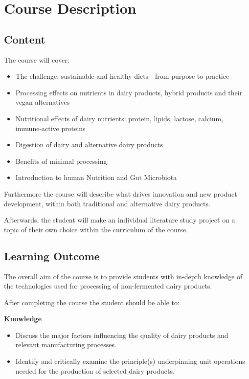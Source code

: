 \chapter*{Course Description}
\setlength{\headheight}{12.71342pt}
\addtolength{\topmargin}{-0.71342pt}


\section*{Content}
The course will cover:
\begin{itemize}
    \item The challenge: sustainable and healthy diets - from purpose to practice
    \item Processing effects on nutrients in dairy products, hybrid products and their vegan alternatives
    \item Nutritional effects of dairy nutrients: protein, lipids, lactose, calcium, immune-active proteins
    \item Digestion of dairy and alternative dairy products
    \item Benefits of minimal processing
    \item Introduction to human Nutrition and Gut Microbiota
\end{itemize} 

\vspace{0.5em}
Furthermore the course will describe what drives innovation and new product development, within both traditional and alternative dairy products. 

Afterwards, the student will make an individual literature study project on a topic of their own choice within the curriculum of the course.


\section*{Learning Outcome}
The overall aim of the course is to provide students with in-depth knowledge of the technologies used for processing of non-fermented dairy products.

\vline

After completing the course the student should be able to:

\textbf{Knowledge}
\begin{itemize}
    \item Discuss the major factors influencing the quality of dairy products and relevant manufacturing processes.
    \item Identify and critically examine the principle(s) underpinning unit operations needed for the production of selected dairy products.
\end{itemize}
\vline

